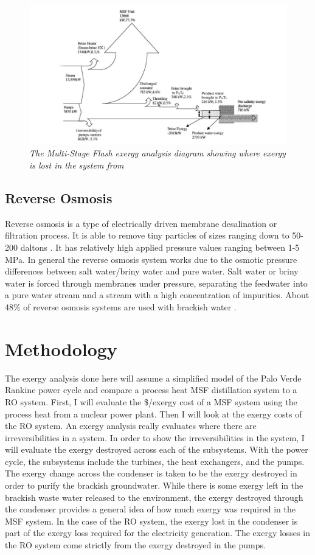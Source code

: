 \documentclass[12pt]{UIdahoMastersThesis}
\begin{document}
\begin{figure}[h!]
\centering
\label{MSF_x}
\includegraphics[width=.4\textwidth]{MSF_exergy.PNG}
\caption{\small \sl The Multi-Stage Flash exergy analysis diagram showing where exergy is lost in the system from \cite{Kahraman2005}}
\centering
\end{figure}

\subsection{Reverse Osmosis}

Reverse osmosis is a type of electrically driven membrane desalination or filtration process. It is able to remove tiny particles of sizes ranging down to 50-200 daltons \cite{Pangarkar2011}. It has relatively high applied pressure values ranging between 1-5 MPa. In general the reverse osmosis system works due to the osmotic pressure differences between salt water/briny water and pure water.  Salt water or briny water is forced through membranes under pressure, separating the feedwater into a pure water stream and a stream with a high concentration of impurities.  About 48\% of reverse osmosis systems are used with brackish water \cite{Pangarkar2011}. 

\section{Methodology}
 The exergy analysis done here will assume a simplified model of the Palo Verde Rankine power cycle and compare a process heat MSF distillation system to a RO system.  First, I will evaluate the \$/exergy cost of a MSF system using the process heat from a nuclear power plant. Then I will look at the exergy costs of the RO system. An exergy analysis really evaluates where there are irreversibilities in a system. In order to show the irreversibilities in the system, I will evaluate the exergy destroyed across each of the subsystems.  With the power cycle, the subsystems include the turbines, the heat exchangers, and the pumps.  The exergy change across the condenser is taken to be the exergy destroyed in order to purify the brackish groundwater. While there is some exergy left in the brackish waste water released to the environment, the exergy destroyed through the condenser provides a general idea of how much exergy was required in the MSF system. In the case of the RO system, the exergy lost in the condenser is part of the exergy loss required for the electricity generation. The exergy losses in the RO system come strictly from the exergy destroyed in the pumps. 
 
\end{document}
